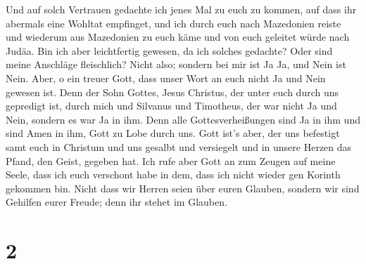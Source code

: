  Und auf solch Vertrauen gedachte ich jenes Mal zu euch
zu kommen, auf dass ihr abermals eine Wohltat empfinget, 
und ich durch euch nach Mazedonien reiste und wiederum aus Mazedonien zu
euch käme und von euch geleitet würde nach Judäa.  Bin
ich aber leichtfertig gewesen, da ich solches gedachte? Oder sind meine
Anschläge fleischlich? Nicht also; sondern bei mir ist Ja Ja, und Nein
ist Nein.  Aber, o ein treuer Gott, dass unser Wort an
euch nicht Ja und Nein gewesen ist.  Denn der Sohn
Gottes, Jesus Christus, der unter euch durch uns gepredigt ist, durch
mich und Silvanus und Timotheus, der war nicht Ja und Nein, sondern es
war Ja in ihm.  Denn alle Gottesverheißungen sind Ja in
ihm und sind Amen in ihm, Gott zu Lobe durch uns.  Gott
ist's aber, der uns befestigt samt euch in Christum und uns gesalbt
 und versiegelt und in unsere Herzen das Pfand, den
Geist, gegeben hat.  Ich rufe aber Gott an zum Zeugen auf
meine Seele, dass ich euch verschont habe in dem, dass ich nicht wieder
gen Korinth gekommen bin.  Nicht dass wir Herren seien
über euren Glauben, sondern wir sind Gehilfen eurer Freude; denn ihr
stehet im Glauben.

\hypertarget{section-1}{%
\section{2}\label{section-1}}

